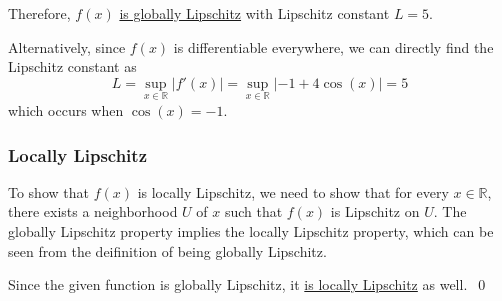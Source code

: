 Therefore, \( f(x) \) \underline{is globally Lipschitz} with Lipschitz constant \( L = 5 \).

\clearpage
Alternatively, since \( f(x) \) is differentiable everywhere, we can directly find the Lipschitz constant as
\[
    L = \sup_{x \in \mathbb{R}} \lvert f'(x) \rvert
    =
    \sup_{x \in \mathbb{R}} \lvert -1 + 4\cos(x) \rvert
    =
    5
\]
which occurs when \( \cos(x) = -1 \).

\subsubsection*{Locally Lipschitz}

To show that \( f(x) \) is locally Lipschitz, we need to show that for every \( x \in \mathbb{R} \), there exists a neighborhood \( U \) of \( x \) such that \( f(x) \) is Lipschitz on \( U \).
The globally Lipschitz property implies the locally Lipschitz property, which can be seen from the deifinition of being globally Lipschitz.

Since the given function is globally Lipschitz, it \underline{is locally Lipschitz} as well.~\qed

